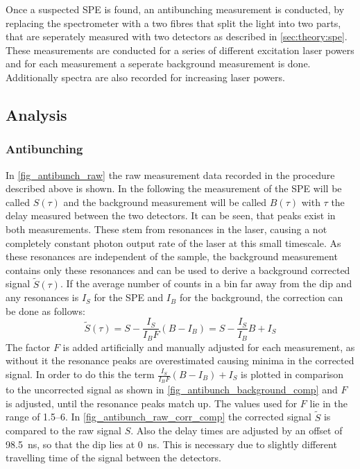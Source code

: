 Once a suspected SPE is found, an antibunching measurement is conducted, by replacing the spectrometer with a two fibres that split the light into two parts, that are seperately measured with two detectors as described in \cref{sec:theory:spe}.
These measurements are conducted for a series of different excitation laser powers and for each measurement a seperate background measurement is done. %
Additionally spectra are also recorded for increasing laser powers. %

\subsection{Analysis}
\subsubsection{Antibunching}

In \cref{fig_antibunch_raw} the raw measurement data recorded in the procedure described above is shown.
In the following the measurement of the SPE will be called $S(\tau)$ and the background measurement will be called $B(\tau)$ with $\tau$ the delay measured between the two detectors.
It can be seen, that peaks exist in both measurements.
These stem from resonances in the laser, causing a not completely constant photon output rate of the laser at this small timescale.
As these resonances are independent of the sample, the background measurement contains only these resonances and can be used to derive a background corrected signal $\tilde{S} (\tau)$.
If the average number of counts in a bin far away from the dip and any resonances is $I_S$ for the SPE and $I_B$ for the background, the correction can be done as follows:
\begin{equation}
  \tilde{S} (\tau) = S - \frac{I_S}{I_B F} (B-I_B) = S - \frac{I_S}{I_B} B + I_S
\end{equation}
The factor $F$ is added artificially and manually adjusted for each measurement, as without it the resonance peaks are overestimated causing minima in the corrected signal.
In order to do this the term $\frac{I_S}{I_B F} (B-I_B) + I_S$ is plotted in comparison to the uncorrected signal as shown in \cref{fig_antibunch_background_comp} and $F$ is adjusted, until the resonance peaks match up.
The values used for $F$ lie in the range of \SIrange{1,5}{6}{}.
In \cref{fig_antibunch_raw_corr_comp} the corrected signal $\tilde{S}$ is compared to the raw signal $S$.
Also the delay times are adjusted by an offset of \SI{98,5}{ns}, so that the dip lies at \SI{0}{ns}.
This is necessary due to slightly different travelling time of the signal between the detectors.


